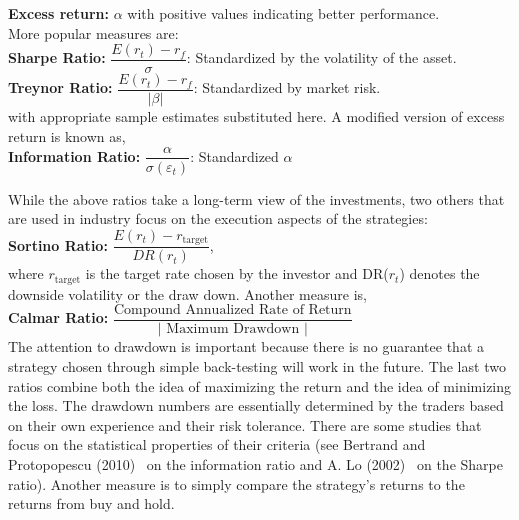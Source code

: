 \noindent\textbf{Excess return: }$\alpha$ with positive values indicating better performance. \\

\noindent More popular measures are:\\

\noindent \textbf{Sharpe Ratio: } $\dfrac{E(r_{t}) - r_f}{\sigma}$: Standardized by the volatility of the asset. \\

\noindent \textbf{Treynor Ratio: } $\dfrac{E(r_{t}) - r_f}{\left|\beta \right|}$: Standardized by market risk. \\

\noindent with appropriate sample estimates substituted here. A modified version of excess return is known as, \\

\noindent \textbf{Information Ratio: } $\dfrac{\alpha}{\sigma(\varepsilon_{t})}$: Standardized $\alpha$

While the above ratios take a long-term view of the investments, two others that are used in industry focus on the execution aspects of the strategies: \\

\noindent \textbf{Sortino Ratio: } $\dfrac{E(r_{t}) - r_{\text{target}}}{DR(r_{t})}$, \\

\noindent where $r_{\text{target}}$ is the target rate chosen by the investor and DR($r_t$) denotes the downside volatility or the draw down. Another measure is, \\

\noindent \textbf{Calmar Ratio: } $\dfrac{\text{Compound Annualized Rate of Return}}{\left| \text{ Maximum Drawdown }\right|}$ \\


The attention to drawdown is important because there is no guarantee that a strategy chosen through simple back-testing will work in the future. The last two ratios combine both the idea of maximizing the return and the idea of minimizing the loss. The drawdown numbers are essentially determined by the traders based on their own experience and their risk tolerance. There are some studies that focus on the statistical properties of their criteria (see Bertrand and Protopopescu (2010)~\cite{bertrand} on the information ratio and A. Lo (2002)~\cite{awlo} on the Sharpe ratio). Another measure is to simply compare the strategy's returns to the returns from buy and hold.


